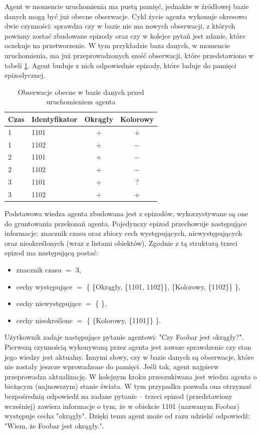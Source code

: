 Agent w momencie uruchomienia ma pustą pamięć, jednakże w źródłowej bazie danych mogą być już obecne obserwacje. Cykl życie agenta wykonuje okresowo dwie czynności: sprawdza czy w bazie nie ma nowych obserwacji, z których powinny zostać zbudowane epizody oraz czy w kolejce pytań jest zdanie, które oczekuje na przetworzenie. W tym przykładzie baza danych, w momencie uruchomienia, ma już przeprowadzonych sześć obserwacji, które przedstawiono w tabeli \ref{tab:obserwacje1}. Agent buduje z nich odpowiednie epizody, które ładuje do pamięci epizodycznej.

\begin{table}[H]
	\caption{Obserwacje obecne w bazie danych przed uruchomieniem agenta}
	\label{tab:obserwacje1}
	\centering
	\begin{tabular}{|l|l|c|c|} \hline
		\textbf{Czas} & \textbf{Identyfikator} & \textbf{Okrągły} & \textbf{Kolorowy} \\ \hline
		1  &  1101  &  $ + $  &  $ + $  \\ \hline
		1  &  1102  &  $ + $  &  $ - $  \\ \hline
		2  &  1101  &  $ + $  &  $ - $  \\ \hline
		2  &  1102  &  $ + $  &  $ - $  \\ \hline
		3  &  1101  &  $ + $  &  $ ? $  \\ \hline
		3  &  1102  &  $ + $  &  $ + $  \\ \hline
	\end{tabular}
\end{table}

Podstawowa wiedza agenta zbudowana jest z epizodów, wykorzystywane są one do gruntowania przekonań agenta. Pojedynczy epizod przechowuje następujące informacje: znacznik czasu oraz zbiory cech występujących, niewystępujących oraz nieokreślonych (wraz z listami obiektów). Zgodnie z tą strukturą trzeci epizod ma następującą postać:

\begin{itemize}
	\setlength{\itemindent}{.5in}
	\item znacznik czasu $ = $ 3,
	\item cechy występujące $ = $ \{ \{Okrągły, \{1101, 1102\}\}, \{Kolorowy, \{1102\}\} \},
	\item cechy niewystępujące $ = $ \{ \},
	\item cechy nieokreślone $ = $ \{ \{Kolorowy, \{1101\}\} \}.
\end{itemize}  

Użytkownik zadaje następujące pytanie agentowi: "Czy Foobar jest okrągły?". Pierwszą czynnością wykonywaną przez agenta jest zawsze sprawdzenie czy stan jego wiedzy jest aktualny. Innymi słowy, czy w bazie danych są obserwacje, które nie zostały jeszcze wprowadzone do pamięci. Jeśli tak, agent najpierw przeprowadza aktualizację. W kolejnym kroku przeszukiwana jest wiedza agenta o bieżącym (najnowszym) stanie świata. W tym przypadku pozwala ona otrzymać bezpośrednią odpowiedź na zadane pytanie -- trzeci epizod (przedstawiony wcześniej) zawiera informacje o tym, że w obiekcie 1101 (nazwanym Foobar) występuje cecha "okrągły". Dzięki temu agent może od razu udzielić odpowiedź: "Wiem, że Foobar jest okrągły.".


